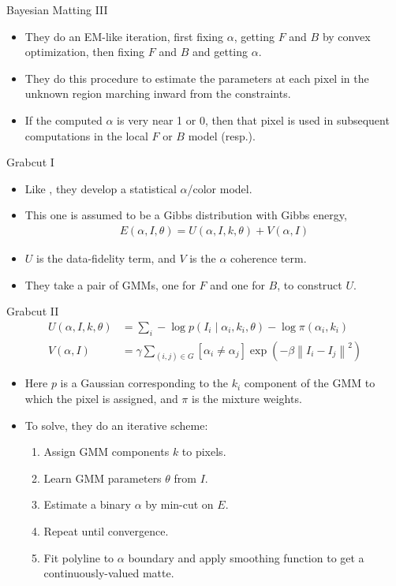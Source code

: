 \documentclass{beamer}
\providecommand{\norm}[1]{\left\lVert #1 \right\rVert}
\begin{document}
\begin{frame}{Bayesian Matting \cite{chuang2001bayesian} III}
 \begin{itemize}
  \item They do an EM-like iteration, first fixing $\alpha$, getting $F$ and $B$ by
        convex optimization, then fixing $F$ and $B$ and getting $\alpha$.
  \item They do this procedure to estimate the parameters at each pixel in the
        unknown region marching inward from the constraints.
  \item If the computed $\alpha$ is very near 1 or 0, then that pixel is used in
        subsequent computations in the local $F$ or $B$ model (resp.).
 \end{itemize}
\end{frame}

\begin{frame}{Grabcut \cite{rother2004grabcut} I}
 \begin{itemize}
  \item Like \cite{chuang2001bayesian}, they develop a statistical $\alpha$/color model.
  \item This one is assumed to be a Gibbs distribution with Gibbs energy,
  \begin{align}
   E(\alpha,I,\theta) = U(\alpha,I,k,\theta)+V(\alpha,I)
  \end{align}
  \item $U$ is the data-fidelity term, and $V$ is the $\alpha$ coherence term.
  \item They take a pair of GMMs, one for $F$ and one for $B$, to construct $U$.
 \end{itemize}
\end{frame}

\begin{frame}{Grabcut \cite{rother2004grabcut} II}
 \begin{align}
  U(\alpha,I,k,\theta) &= \sum_i -\log p(I_i \mid \alpha_i,k_i,\theta) -\log \pi(\alpha_i,k_i) \\
  V(\alpha,I) &= \gamma \sum_{(i,j) \in G} [\alpha_i \neq \alpha_j] \exp(-\beta\norm{I_i-I_j}^2)
 \end{align}
 \begin{itemize}
  \item Here $p$ is a Gaussian corresponding to the $k_i$ component of the GMM to which
        the pixel is assigned, and $\pi$ is the mixture weights.
  \item To solve, they do an iterative scheme:
  \begin{enumerate}
   \item Assign GMM components $k$ to pixels.
   \item Learn GMM parameters $\theta$ from $I$.
   \item Estimate a binary $\alpha$ by min-cut on $E$.
   \item Repeat until convergence.
   \item Fit polyline to $\alpha$ boundary and apply smoothing function to get
         a continuously-valued matte.
  \end{enumerate}
 \end{itemize}
\end{frame}
\end{document}
